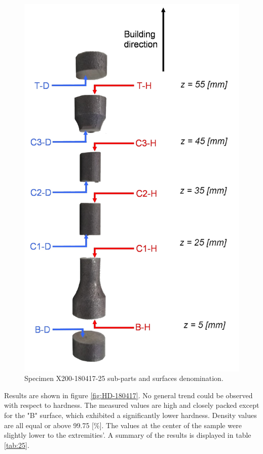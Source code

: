 \begin{figure}[ht]
\centering
\centerline{\includegraphics[scale=0.23]{Images/Saus}}
\decoRule
\caption[Specimen X200-180417-25 sub-parts and surfaces denomination]{Specimen X200-180417-25 sub-parts and surfaces denomination.}
\label{fig:saus}
\end{figure}

Results are shown in figure \ref{fig:HD-180417}. No general trend could be observed with respect to hardness. The measured values are high and closely packed except for the "B" surface, which exhibited a significantly lower hardness. Density values are all equal or above 99.75 [\%]. The values at the center of the sample were slightly lower to the extremities'. A summary of the results is displayed in table \ref{tab:25}.

